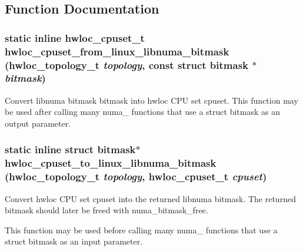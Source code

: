 \subsection{Function Documentation}
\hypertarget{group__hwlocality__linux__libnuma__bitmask_gaa7ac171ac41f209bfbc710ca690affe0}{
\subsubsection[{hwloc\_\-cpuset\_\-from\_\-linux\_\-libnuma\_\-bitmask}]{\setlength{\rightskip}{0pt plus 5cm}static inline {\bf hwloc\_\-cpuset\_\-t} hwloc\_\-cpuset\_\-from\_\-linux\_\-libnuma\_\-bitmask ({\bf hwloc\_\-topology\_\-t} {\em topology}, \/  const struct bitmask $\ast$ {\em bitmask})}}
\label{group__hwlocality__linux__libnuma__bitmask_gaa7ac171ac41f209bfbc710ca690affe0}


Convert libnuma bitmask {\ttfamily bitmask} into hwloc CPU set {\ttfamily cpuset}. This function may be used after calling many numa\_\- functions that use a struct bitmask as an output parameter. \hypertarget{group__hwlocality__linux__libnuma__bitmask_ga66720508d673173aea250095be22822d}{
\subsubsection[{hwloc\_\-cpuset\_\-to\_\-linux\_\-libnuma\_\-bitmask}]{\setlength{\rightskip}{0pt plus 5cm}static inline struct bitmask$\ast$ hwloc\_\-cpuset\_\-to\_\-linux\_\-libnuma\_\-bitmask ({\bf hwloc\_\-topology\_\-t} {\em topology}, \/  {\bf hwloc\_\-cpuset\_\-t} {\em cpuset})}}
\label{group__hwlocality__linux__libnuma__bitmask_ga66720508d673173aea250095be22822d}


Convert hwloc CPU set {\ttfamily cpuset} into the returned libnuma bitmask. The returned bitmask should later be freed with numa\_\-bitmask\_\-free.

This function may be used before calling many numa\_\- functions that use a struct bitmask as an input parameter. 
